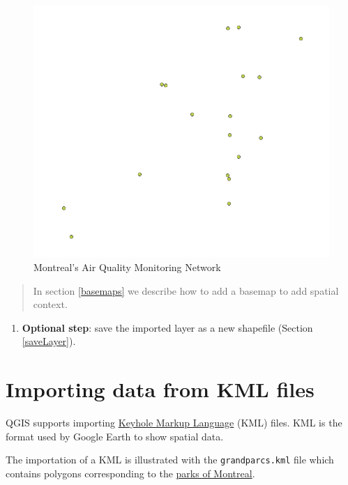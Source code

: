 \documentclass[]{book}
\providecommand{\tightlist}{%
  \setlength{\itemsep}{0pt}\setlength{\parskip}{0pt}}
\theoremstyle{definition}
\theoremstyle{definition}
\theoremstyle{definition}
\theoremstyle{remark}
\begin{document}
\begin{figure}

{\centering \includegraphics[width=11.49in]{figures/Stations_RSQA} 

}

\caption{Montreal's Air Quality Monitoring Network}\label{fig:unnamed-chunk-4}
\end{figure}

\begin{quote}
In section \ref{basemaps} we describe how to add a basemap to add
spatial context.
\end{quote}

\begin{enumerate}
\def\labelenumi{\arabic{enumi}.}
\setcounter{enumi}{4}
\tightlist
\item
  \textbf{Optional step}: save the imported layer as a new shapefile
  (Section \ref{saveLayer}).
\end{enumerate}

\section{Importing data from KML
files}\label{importing-data-from-kml-files}

QGIS supports importing
\href{https://developers.google.com/kml/}{Keyhole Markup Language} (KML)
files. KML is the format used by Google Earth to show spatial data.

The importation of a KML is illustrated with the \texttt{grandparcs.kml}
file which contains polygons corresponding to the
\href{http://donnees.ville.montreal.qc.ca/dataset/grands-parcs}{parks of
Montreal}.
\end{document}
